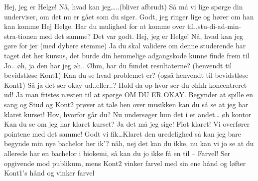 \documentclass[a4paper,11pt]{article}
\begin{document}
\begin{sketch}
 Hej, jeg er Helge! Nå, hvad kan jeg…..(bliver afbrudt)
 Så må vi lige spørge din underviser, om det nu er gået som du siger.
 Godt, jeg ringer lige og hører om han kan komme
 Hej Helge. Har du mulighed for at komme over til..stu-di-ad-min-stra-tionen med det samme? Det var godt.
 Hej, jeg er Helge! Nå, hvad kan jeg gøre for jer (med dybere stemme)
 Ja du skal validere om denne studerende har taget det her kursus, det burde din hemmelige adgangskode kunne finde frem til
 Jo.. øh, ja den har jeg øh..
 Øhm, har du fundet resultaterne? (henvendt til bevidstløse Kont1)
 Kan du se hvad problemet er? (også henvendt til bevidstløse Kont1)
 Så ja det ser okay ud..eller..? Hold da op hvor ser du øhhh koncentreret ud!
Ja man fristes næsten til at spørge OM DU ER OKAY.
 Begynder at spille en sang og Stud og Kont2 prøver at tale hen over musikken
 kan du så se at jeg har klaret kurset! Hov, hvorfor går du?
 Nu undersøger hun det i et andet… øh kontor
 Kan du se om jeg har klaret kurset?
 Ja det må jeg sige! Flot klaret! Vi overfører pointene med det samme!
 Godt vi fik\ldots Klaret den uredelighed 
 så kan jeg bare begynde min nye bachelor her ik’? 
 nåh, nej det kan du ikke, nu kan vi jo se at du allerede har en bachelor i biokemi, så kan du jo ikke få en til -- Farvel!
 Ser opgivende mod publikum, mens Kont2 vinker farvel med sin ene hånd og løfter Kont1’s hånd og vinker farvel

\end{sketch}
\end{document}
